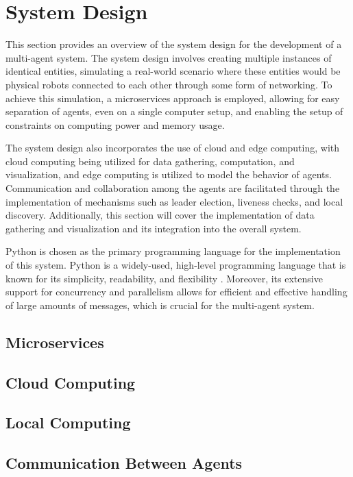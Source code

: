 \chapter{System Design}
This section provides an overview of the system design for the development of a multi-agent system. The system design involves creating multiple instances of identical entities, simulating a real-world scenario where these entities would be physical robots connected to each other through some form of networking. To achieve this simulation, a microservices approach is employed, allowing for easy separation of agents, even on a single computer setup, and enabling the setup of constraints on computing power and memory usage.

The system design also incorporates the use of cloud and edge computing, with cloud computing being utilized for data gathering, computation, and visualization, and edge computing is utilized to model the behavior of agents. Communication and collaboration among the agents are facilitated through the implementation of mechanisms such as leader election, liveness checks, and local discovery. Additionally, this section will cover the implementation of data gathering and visualization and its integration into the overall system.

Python is chosen as the primary programming language for the implementation of this system. Python is a widely-used, high-level programming language that is known for its simplicity, readability, and flexibility \cite{python_docs}. Moreover, its extensive support for concurrency and parallelism allows for efficient and effective handling of large amounts of messages, which is crucial for the multi-agent system.
\section{Microservices}


\section{Cloud Computing}


\section{Local Computing}


\section{Communication Between Agents}


